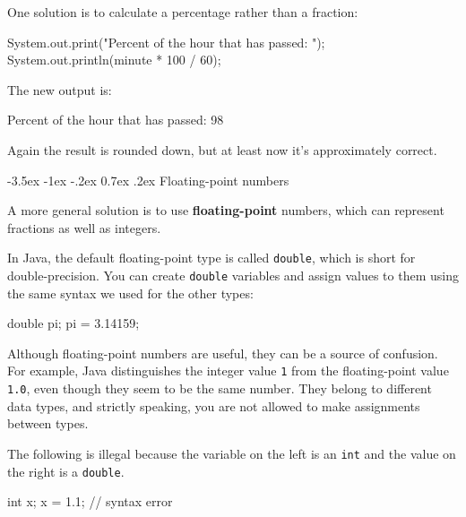 \documentclass[12pt]{book}
\makeatletter
\theoremstyle{exercise}
\newcommand{\java}[1]{\verb"#1"}
\renewcommand{\section}{\@startsection{section}{1}{\z@}%
    {-3.5ex \@plus -1ex \@minus -.2ex}%
    {0.7ex \@plus.2ex}%
    {\normalfont\Large\bfseries}}
\newcommand{\java}[1]{\lstinline{#1}} %
\makeatother
\begin{document}
One solution is to calculate a percentage rather than a fraction:

\begin{code}
    System.out.print("Percent of the hour that has passed: ");
    System.out.println(minute * 100 / 60);
\end{code}

The new output is:

\begin{stdout}
Percent of the hour that has passed: 98
\end{stdout}

Again the result is rounded down, but at least now it's approximately correct.


\section{Floating-point numbers}


A more general solution is to use {\bf floating-point} numbers, which can represent fractions as well as integers.

In Java, the default floating-point type is called \java{double}, which is short for double-precision.
You can create \java{double} variables and assign values to them using the same syntax we used for the other types:

\begin{code}
    double pi;
    pi = 3.14159;
\end{code}

Although floating-point numbers are useful, they can be a source of confusion.
For example, Java distinguishes the integer value \java{1} from the floating-point value \java{1.0}, even though they seem to be the same number.
They belong to different data types, and strictly speaking, you are not allowed to make assignments between types.

The following is illegal because the variable on the left is an \java{int} and the value on the right is a \java{double}.

\begin{code}
    int x;
    x = 1.1;  // syntax error
\end{code}
\end{document}
